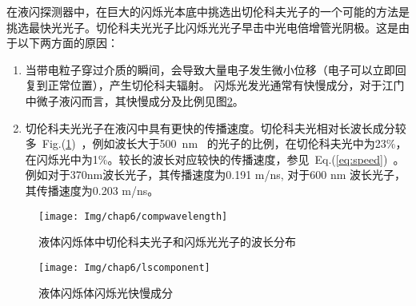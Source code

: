 在液闪探测器中，在巨大的闪烁光本底中挑选出切伦科夫光子的一个可能的方法是挑选最快光光子。切伦科夫光光子比闪烁光光子早击中光电倍增管光阴极。这是由于以下两方面的原因：
\begin{enumerate}
\item 当带电粒子穿过介质的瞬间，会导致大量电子发生微小位移（电子可以立即回复到正常位置），产生切伦科夫辐射\citep{jelley1955cerenkov}。 闪烁光发光通常有快慢成分，对于江门中微子液闪而言，其快慢成分及比例见图\ref{fig:plscomp}。
\item 切伦科夫光光子在液闪中具有更快的传播速度。切伦科夫光相对长波长成分较多~Fig.(\ref{fig:compwavelength})~，例如波长大于500~nm~ 的光子的比例，在切伦科夫光中为23\%，在闪烁光中为1\%。较长的波长对应较快的传播速度，参见~Eq.(\ref{eq:speed})~。 例如对于370nm波长光子，其传播速度为0.191 m/ns, 对于600 nm 波长光子，其传播速度为0.203 m/ns。
\end{enumerate}
\begin{figure}[!htbp]
  \centering
   \texttt{[image: Img/chap6/compwavelength]}
    \caption{液体闪烁体中切伦科夫光子和闪烁光光子的波长分布}
  \label{fig:compwavelength}
\end{figure}
\begin{figure}[!htbp]
  \centering
   \texttt{[image: Img/chap6/lscomponent]}
    \caption{液体闪烁体闪烁光快慢成分}
  \label{fig:plscomp}
\end{figure}

